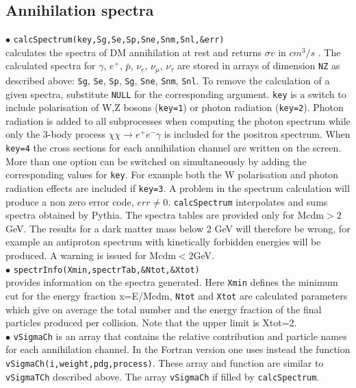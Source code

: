 \documentclass[12pt,a4paper]{article}
\begin{document}
\subsection{Annihilation spectra}
$\bullet$ \verb|calcSpectrum(key,Sg,Se,Sp,Sne,Snm,Snl,&err)|\\
calculates  the spectra  of DM annihilation 
at rest and returns $\sigma v$ in $cm^3/s$ . The calculated spectra
for $\gamma$, $e^+$, $\bar{p}$, $\nu_e$, $\nu_{\mu}$, $\nu_{\tau}$ 
are stored in arrays of dimension \verb|NZ| as described above: \verb|Sg|, \verb|Se|, \verb|Sp|, 
\verb|Sg|, \verb|Sne|, \verb|Snm|, \verb|Snl|. 
 To remove the calculation of a given spectra, substitute  
\verb|NULL| for the corresponding argument. 
\verb|key| is a switch to include polarisation of W,Z bosons (\verb|key=1|) or
 photon radiation (\verb|key=2|).  Photon radiation is added to all subprocesses when computing the photon spectrum while
only the 3-body process $\chi\chi\rightarrow e^+e^-\gamma$ is included  for the positron spectrum. 
When \verb|key=4| the cross sections for each annihilation channel are written on the screen. More than one option
can be switched on simultaneously by adding the corresponding values for \verb|key|. 
For example both the W polarisation and photon radiation effects  are included if
\verb|key=3|.
A problem in the spectrum calculation will produce a non zero error code, $err\neq
0$. {\tt calcSpectrum} interpolates and sums spectra obtained
by Pythia. The spectra tables are provided only for Mcdm$>2$GeV. The results for a dark matter
mass below 2 GeV will therefore be wrong, for example an antiproton
spectrum  with  kinetically forbidden energies will be produced. A warning is issued for Mcdm$<2$GeV. \\  
$\bullet$ \verb|spectrInfo(Xmin,spectrTab,&Ntot,&Xtot)|\\
provides information on the spectra generated. Here \verb|Xmin| defines the minimum 
cut for the energy fraction x=E/Mcdm, \verb|Ntot| and \verb|Xtot| are calculated parameters 
which give on average the total number and the energy fraction of the final particles 
produced per collision. Note that the upper limit is Xtot=2.\\
$\bullet$ \verb|vSigmaCh| is an array that contains the relative contribution and particle names for each
annihilation channel. In the Fortran version one uses instead
the function\\
\noindent \verb|vSigmaCh(i,weight,pdg,process)|. These array and function
are similar to {\tt vSigmaTCh} described above. The array {\tt vSigmaCh} if filled by 
{\tt calcSpectrum}.
\end{document}

